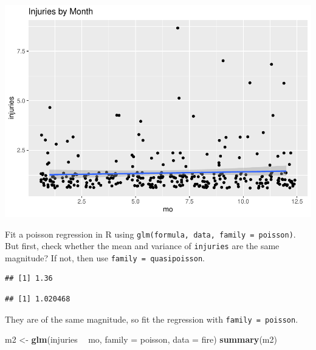 \documentclass[
]{book}
\newenvironment{Shaded}{\begin{snugshade}}{\end{snugshade}}
\newcommand{\DataTypeTok}[1]{\textcolor[rgb]{0.13,0.29,0.53}{#1}}
\newcommand{\KeywordTok}[1]{\textcolor[rgb]{0.13,0.29,0.53}{\textbf{#1}}}
\newcommand{\NormalTok}[1]{#1}
\newcommand{\OperatorTok}[1]{\textcolor[rgb]{0.81,0.36,0.00}{\textbf{#1}}}
\newcommand{\StringTok}[1]{\textcolor[rgb]{0.31,0.60,0.02}{#1}}
\begin{document}
\includegraphics{data-sci_files/figure-latex/unnamed-chunk-37-1.pdf}

Fit a poisson regression in R using \texttt{glm(formula,\ data,\ family\ =\ poisson)}. But first, check whether the mean and variance of \texttt{injuries} are the same magnitude? If not, then use \texttt{family\ =\ quasipoisson}.

\begin{Shaded}
\end{Shaded}

\begin{verbatim}
## [1] 1.36
\end{verbatim}

\begin{Shaded}
\end{Shaded}

\begin{verbatim}
## [1] 1.020468
\end{verbatim}

They are of the same magnitude, so fit the regression with \texttt{family\ =\ poisson}.

\begin{Shaded}
\begin{Highlighting}[]
\NormalTok{m2 <-}\StringTok{ }\KeywordTok{glm}\NormalTok{(injuries }\OperatorTok{~}\StringTok{ }\NormalTok{mo, }\DataTypeTok{family =}\NormalTok{ poisson, }\DataTypeTok{data =}\NormalTok{ fire)}
\KeywordTok{summary}\NormalTok{(m2)}
\end{Highlighting}
\end{Shaded}
\end{document}
